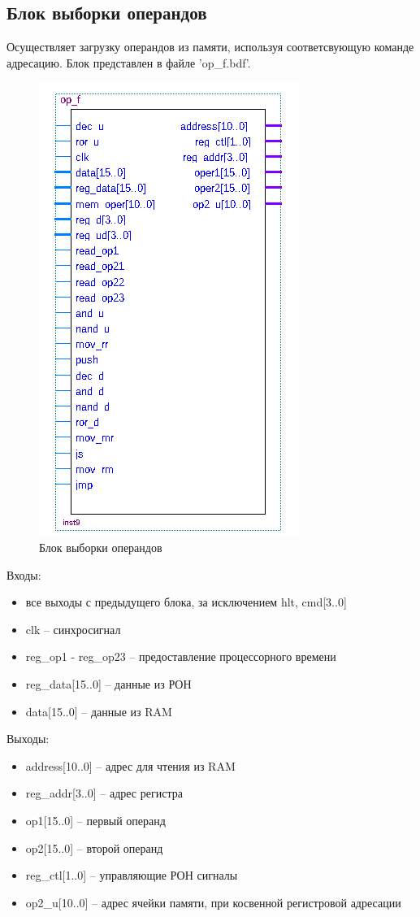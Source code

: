 \subsection{Блок выборки операндов}
Осуществляет загрузку операндов из памяти, используя соответсвующую команде адресацию. Блок представлен в файле 'op\_f.bdf'.

\begin{figure}[ht]
\centering
    \includegraphics[scale=0.8]{opfb}
    \caption{Блок выборки операндов}
\end{figure}

Входы:
\begin{itemize}
    \item все выходы с предыдущего блока, за исключением hlt, cmd[3..0]
    \item clk -- синхросигнал
    \item reg\_op1 - reg\_op23 -- предоставление процессорного времени
    \item reg\_data[15..0] -- данные из РОН
    \item data[15..0] -- данные из RAM
\end{itemize}
Выходы:
\begin{itemize}
    \item address[10..0] -- адрес для чтения из RAM
    \item reg\_addr[3..0] -- адрес регистра
    \item op1[15..0] -- первый операнд
    \item op2[15..0] -- второй операнд
    \item reg\_ctl[1..0] -- управляющие РОН сигналы
    \item op2\_u[10..0] -- адрес ячейки памяти, при косвенной регистровой адресации
\end{itemize}

